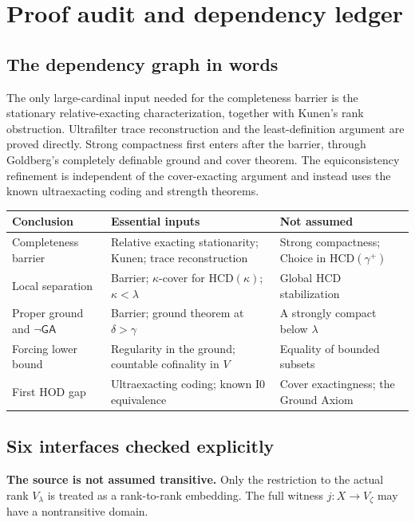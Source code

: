 \documentclass[11pt,letterpaper]{article}
\theoremstyle{definition}
\newcommand{\Izero}{\mathrm{I0}}
\newcommand{\HCD}{\mathrm{HCD}}
\newcommand{\GA}{\mathsf{GA}}
\begin{document}
\section{Proof audit and dependency ledger}\label{sec:audit}

\subsection{The dependency graph in words}

The only large-cardinal input needed for the completeness barrier is the stationary relative-exacting characterization, together with Kunen's rank obstruction. Ultrafilter trace reconstruction and the least-definition argument are proved directly. Strong compactness first enters after the barrier, through Goldberg's completely definable ground and cover theorem. The equiconsistency refinement is independent of the cover-exacting argument and instead uses the known ultraexacting coding and strength theorems.

\begin{center}
\small
\begin{tabularx}{\textwidth}{@{}P{.245\textwidth}YP{.255\textwidth}@{}}
\toprule
\textbf{Conclusion} & \textbf{Essential inputs} & \textbf{Not assumed}\\
\midrule
Completeness barrier & Relative exacting stationarity; Kunen; trace reconstruction & Strong compactness; Choice in $\HCD(\gamma^+)$\\[5pt]
Local separation & Barrier; $\kappa$-cover for $\HCD(\kappa)$; $\kappa<\lambda$ & Global HCD stabilization\\[5pt]
Proper ground and $\neg\GA$ & Barrier; ground theorem at $\delta>\gamma$ & A strongly compact below $\lambda$\\[5pt]
Forcing lower bound & Regularity in the ground; countable cofinality in $V$ & Equality of bounded subsets\\[5pt]
First HOD gap & Ultraexacting coding; known $\Izero$ equivalence & Cover exactingness; the Ground Axiom\\
\bottomrule
\end{tabularx}
\end{center}

\subsection{Six interfaces checked explicitly}

\textbf{The source is not assumed transitive.} Only the restriction to the actual rank $V_\lambda$ is treated as a rank-to-rank embedding. The full witness $j:X\to V_\zeta$ may have a nontransitive domain.
\end{document}
